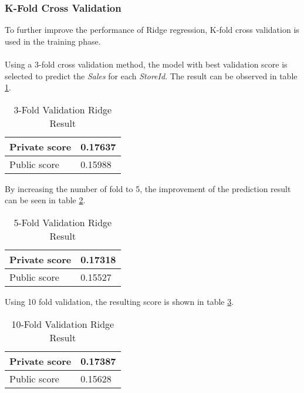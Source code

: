 \subsubsection{K-Fold Cross Validation}
To further improve the performance of Ridge regression, K-fold cross validation is used in the training phase. \\ \\
Using a 3-fold cross validation method, the model with best validation score is selected to predict the \textit{Sales} for each \textit{StoreId}. The result can be observed in table \ref{tab:ridge_3_fold}.
\begin{table}[H]
	\centering
	\caption{3-Fold Validation Ridge Result}
	\label{tab:ridge_3_fold}
	\begin{tabular}{|m{100pt}|m{50pt}|}
		\hline
		Private score & 0.17637 \\ \hline
		Public score  & 0.15988 \\ \hline
	\end{tabular}
\end{table} \noindent By increasing the number of fold to 5, the improvement of the prediction result can be seen in table \ref{tab:ridge_5_fold}.
\begin{table}[H]
	\centering
	\caption{5-Fold Validation Ridge Result}
	\label{tab:ridge_5_fold}
	\begin{tabular}{|m{100pt}|m{50pt}|}
		\hline
		Private score & 0.17318 \\ \hline
		Public score  & 0.15527 \\ \hline
	\end{tabular}
\end{table} \noindent Using 10 fold validation, the resulting score is shown in table \ref{tab:ridge_10_fold}.
\begin{table}[H]
	\centering
	\caption{10-Fold Validation Ridge Result}
	\label{tab:ridge_10_fold}
	\begin{tabular}{|m{100pt}|m{50pt}|}
		\hline
		Private score & 0.17387 \\ \hline
		Public score  & 0.15628 \\ \hline
	\end{tabular}
\end{table}

